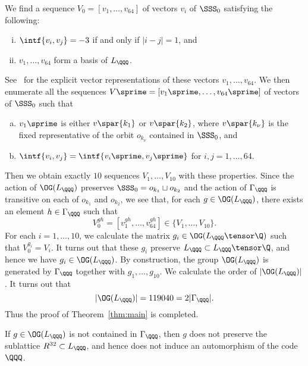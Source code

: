\documentclass{amsart}
\begin{document}
%
We find a sequence $V_0=[v_1, \dots, v_{64}]$
of vectors $v_i$ of $\SSS_0$   satisfying the following: %
%
\begin{enumerate}[(i)]
\item $\intf{v_i, v_j}=-3$ if and only if $|i-j|=1$, and 
\item $v_1, \dots, v_{64}$ form a basis of $L_{\QQQ}$.
\end{enumerate}
%
See~\cite{compdata} for the explicit vector representations of these 
vectors $v_1, \dots, v_{64}$.
We then enumerate all the sequences
$V\sprime=[v_1\sprime, \dots, v_{64}\sprime]$ 
of vectors of $\SSS_0$ such that
%
\begin{enumerate}[(a)]
\item $v_1\sprime$ is either $v\spar{k_1}$ or  $v\spar{k_2}$,
where $v\spar{k_{\nu}}$ is the fixed representative of the orbit $o_{k_{\nu}}$ contained in $\SSS_0$, and
\item $\intf{v_i, v_j}=\intf{v_i\sprime, v_j\sprime}$ for $i, j=1, \dots, 64$.
\end{enumerate}
%
Then we obtain exactly 
$10$ sequences $V_1, \dots, V_{10}$ with these properties.
Since the action of $\OG(L_{\QQQ})$ preserves $\SSS_{0}=o_{k_1}\sqcup o_{k_2}$
and the action of $\Gamma_{\QQQ}$ is transitive on each of $o_{k_1}$ and $o_{k_2}$,
we see that, for each $g\in \OG(L_{\QQQ})$,
there exists an element $h\in \Gamma_{\QQQ}$ such that
$$
V_0^{gh}=[v_1^{gh}, \dots, v_{64}^{gh}]\in \{V_1, \dots, V_{10}\}.
$$
For each $i=1, \dots, 10$,
we calculate
the matrix $g_i\in \OG(L_{\QQQ}\tensor \Q)$ such that
$V_0^{g_i}=V_i$.
It turns out that these $g_i$ preserve $L_{\QQQ}\subset L_{\QQQ}\tensor \Q$,
and hence we have $g_i\in \OG(L_{\QQQ})$.
By construction,
the group $\OG(L_{\QQQ})$ is generated by $\Gamma_{\QQQ}$ together with $g_1, \dots, g_{10}$.
We calculate the order of $|\OG(L_{\QQQ})|$.
It turns out that
$$
|\OG(L_{\QQQ})|=119040=2 |\Gamma_{\QQQ}|.
$$
Thus the proof of Theorem~\ref{thm:main} is completed.
%
\begin{remark}
If $g\in \OG(L_{\QQQ})$ is not contained in $\Gamma_{\QQQ}$,
then $g$ does not preserve the sublattice $R^{32}\subset L_{\QQQ}$,
and hence does not induce an automorphism of the code $\QQQ$.
\end{remark}
%
\end{document}
